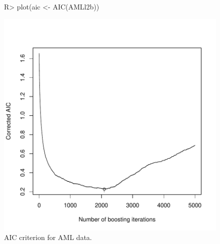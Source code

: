 \documentclass{article}
\newenvironment{Schunk}{}{}
\begin{document}
\begin{figure}
\begin{center}
\begin{Schunk}
\begin{Sinput}
R> plot(aic <- AIC(AMLl2b))
\end{Sinput}
\end{Schunk}
\includegraphics{SurvivalEnsembles-AML-AIC}
\caption{AIC criterion for AML data.}
\end{center}
\end{figure}
\end{document}
